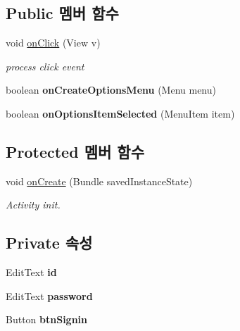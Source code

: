 \subsection*{Public 멤버 함수}
\begin{DoxyCompactItemize}
\item 
void \hyperlink{classkookmin_1_1cs_1_1homeflow_1_1_login_activity_a29cfa7fedc97be0ec337678df698100f}{on\+Click} (View v)
\begin{DoxyCompactList}\small\item\em process click event \end{DoxyCompactList}\item 
\hypertarget{classkookmin_1_1cs_1_1homeflow_1_1_login_activity_aaf30dacb9b1247a33814d92f94c6a47d}{}boolean {\bfseries on\+Create\+Options\+Menu} (Menu menu)\label{classkookmin_1_1cs_1_1homeflow_1_1_login_activity_aaf30dacb9b1247a33814d92f94c6a47d}

\item 
\hypertarget{classkookmin_1_1cs_1_1homeflow_1_1_login_activity_a1030ae5e1d39703ce27b03a3644627f9}{}boolean {\bfseries on\+Options\+Item\+Selected} (Menu\+Item item)\label{classkookmin_1_1cs_1_1homeflow_1_1_login_activity_a1030ae5e1d39703ce27b03a3644627f9}

\end{DoxyCompactItemize}
\subsection*{Protected 멤버 함수}
\begin{DoxyCompactItemize}
\item 
void \hyperlink{classkookmin_1_1cs_1_1homeflow_1_1_login_activity_af4c64a06bcf604e369c9d4af370d4951}{on\+Create} (Bundle saved\+Instance\+State)
\begin{DoxyCompactList}\small\item\em Activity init. \end{DoxyCompactList}\end{DoxyCompactItemize}
\subsection*{Private 속성}
\begin{DoxyCompactItemize}
\item 
\hypertarget{classkookmin_1_1cs_1_1homeflow_1_1_login_activity_ac9268855aae891b4b9dae821e2f1e158}{}Edit\+Text {\bfseries id}\label{classkookmin_1_1cs_1_1homeflow_1_1_login_activity_ac9268855aae891b4b9dae821e2f1e158}

\item 
\hypertarget{classkookmin_1_1cs_1_1homeflow_1_1_login_activity_ab6d1fac18412c27ecf94293ed1f28055}{}Edit\+Text {\bfseries password}\label{classkookmin_1_1cs_1_1homeflow_1_1_login_activity_ab6d1fac18412c27ecf94293ed1f28055}

\item 
\hypertarget{classkookmin_1_1cs_1_1homeflow_1_1_login_activity_a6d09cf9476263a19cb6ed6342d4de60c}{}Button {\bfseries btn\+Signin}\label{classkookmin_1_1cs_1_1homeflow_1_1_login_activity_a6d09cf9476263a19cb6ed6342d4de60c}

\end{DoxyCompactItemize}



